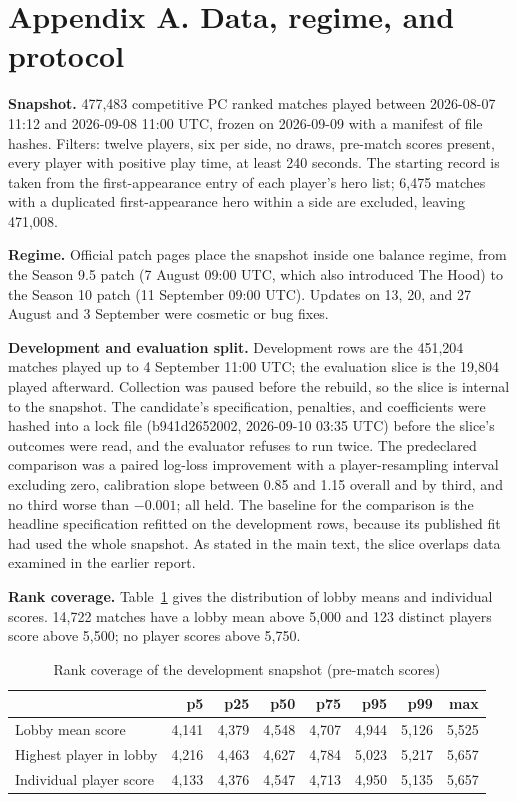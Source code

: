 \documentclass[11pt]{article}
\begin{document}
\FloatBarrier
\appendix
\FloatBarrier
\section*{Appendix A. Data, regime, and protocol}

\textbf{Snapshot.} 477,483 competitive PC ranked matches played between 2026-08-07 11:12 and 2026-09-08 11:00
UTC, frozen on 2026-09-09 with a manifest of file hashes. Filters: twelve players, six per side, no draws,
pre-match scores present, every player with positive play time, at least 240 seconds. The starting record
is taken from the first-appearance entry of each player's hero list; 6,475 matches with a
duplicated first-appearance hero within a side are excluded, leaving 471,008.

\textbf{Regime.} Official patch pages place the snapshot inside one balance regime, from the Season 9.5
patch (7 August 09:00 UTC, which also introduced The Hood) to the Season 10 patch (11 September 09:00
UTC). Updates on 13, 20, and 27 August and 3 September were cosmetic or bug fixes.

\textbf{Development and evaluation split.} Development rows are the 451,204 matches played up to
4 September 11:00 UTC; the evaluation slice is the 19,804 played afterward. Collection was paused before
the rebuild, so the slice is internal to the snapshot. The candidate's specification, penalties, and
coefficients were hashed into a lock file (b941d2652002, 2026-09-10 03:35 UTC) before the slice's outcomes
were read, and the evaluator refuses to run twice. The predeclared comparison was a paired log-loss
improvement with a player-resampling interval excluding zero, calibration slope between 0.85 and 1.15
overall and by third, and no third worse than $-0.001$; all held. The baseline for the comparison is the
headline specification refitted on the development rows, because its published fit had used the whole
snapshot. As stated in the main text, the slice overlaps data examined in the earlier report.

\textbf{Rank coverage.} Table~\ref{tab:cov} gives the distribution of lobby means and individual scores.
14,722 matches have a lobby mean above 5{,}000 and 123 distinct players score above
5{,}500; no player scores above 5{,}750.

\begin{table}[H]\centering\small
\caption{Rank coverage of the development snapshot (pre-match scores)}\label{tab:cov}
\begin{tabular}{l r r r r r r r}
\toprule
& p5 & p25 & p50 & p75 & p95 & p99 & max \\
\midrule
Lobby mean score & 4,141 & 4,379 & 4,548 & 4,707 & 4,944 & 5,126 & 5,525 \\
Highest player in lobby & 4,216 & 4,463 & 4,627 & 4,784 & 5,023 & 5,217 & 5,657 \\
Individual player score & 4,133 & 4,376 & 4,547 & 4,713 & 4,950 & 5,135 & 5,657 \\
\bottomrule
\end{tabular}
\end{table}
\end{document}
